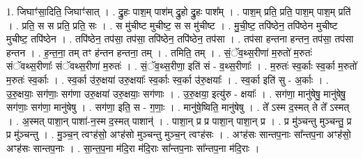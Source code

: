 \documentclass[17pt]{extarticle}
\begin{document}
1. जिघाꣳ॑सा॒दिति॒ जिघाꣳ॑सात् । . द्रु॒हः पाश॒म् पाश॑म् द्रु॒हो द्रु॒हः पाश᳚म् । . पाश॒म् प्रति॒ प्रति॒ पाश॒म् पाश॒म् प्रति॑ । . प्रति॒ स स प्रति॒ प्रति॒ सः । . स मु॑चीष्ट मुचीष्ट॒ स स मु॑चीष्ट । . मु॒ची॒ष्ट॒ तपि॑ष्ठेन॒ तपि॑ष्ठेन मुचीष्ट मुचीष्ट॒ तपि॑ष्ठेन । . तपि॑ष्ठेन॒ तप॑सा॒ तप॑सा॒ तपि॑ष्ठेन॒ तपि॑ष्ठेन॒ तप॑सा । . तप॑सा हन्तना हन्तन॒ तप॑सा॒ तप॑सा हन्तन । . ह॒न्त॒ना॒ तम् तꣳ ह॑न्तन हन्तना॒ तम् । . तमिति॒ तम् । . सं॒ॅव॒थ्स॒रीणा॑ म॒रुतो॑ म॒रुतः॑ संॅवथ्स॒रीणाः᳚ संॅवथ्स॒रीणा॑ म॒रुतः॑ । . सं॒ॅव॒थ्स॒रीणा॒ इति॑ सं - व॒थ्स॒रीणाः᳚ । . म॒रुतः॑ स्व॒र्काः स्व॒र्का म॒रुतो॑ म॒रुतः॑ स्व॒र्काः । . स्व॒र्का उ॑रु॒क्षया॑ उरु॒क्षयाः᳚ स्व॒र्काः स्व॒र्का उ॑रु॒क्षयाः᳚ । . स्व॒र्का इति॑ सु - अ॒र्काः । . उ॒रु॒क्षयाः॒ सग॑णाः॒ सग॑णा उरु॒क्षया॑ उरु॒क्षयाः॒ सग॑णाः । . उ॒रु॒क्षया॒ इत्यु॑रु - क्षयाः᳚ । . सग॑णा॒ मानु॑षेषु॒ मानु॑षेषु॒ सग॑णाः॒ सग॑णा॒ मानु॑षेषु । . सग॑णा॒ इति॒ स - ग॒णाः॒ । . मानु॑षे॒ष्विति॒ मानु॑षेषु । . ते᳚ ऽस्म द॒स्मत् ते ते᳚ ऽस्मत् । . अ॒स्मत् पाशा॒न् पाशा॑-न॒स्म द॒स्मत् पाशान्॑ । . पाशा॒न् प्र प्र पाशा॒न् पाशा॒न् प्र । . प्र मु॑ञ्चन्तु मुञ्चन्तु॒ प्र प्र मु॑ञ्चन्तु । . मु॒ञ्च॒न् त्वꣳह॑सो॒ अꣳह॑सो मुञ्चन्तु मुञ्च॒न् त्वꣳह॑सः । . अꣳह॑सः सान्तप॒नाः सा᳚न्तप॒ना अꣳह॑सो॒ अꣳह॑सः सान्तप॒नाः । . सा॒न्त॒प॒ना म॑दि॒रा म॑दि॒राः सा᳚न्तप॒नाः सा᳚न्तप॒ना म॑दि॒राः । \newline
\end{document}
